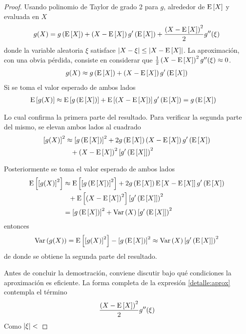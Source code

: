 \begin{proof}
Usando polinomio de Taylor de grado 2 para $g$, alrededor de $\mathrm{E}\left[ X \right]$ y evaluada en $X$
\begin{equation}
g(X) = g\left( \mathrm{E}\left[ X \right] \right) + \left(X - \mathrm{E}\left[ X \right] \right) g^{\prime} \left( \mathrm{E}\left[ X \right] \right) + \frac{\left( X - \mathrm{E}\left[ X \right] \right)^{2}}{2} g^{\prime \prime}(\xi)
\label{detalle:aprox}
\end{equation}
donde la variable aleatoria $\xi$ satisface $\left| X-\xi \right| \leq \left| X - \mathrm{E}\left[ X \right] \right|$.
%
La aproximación, con una obvia pérdida, consiste en considerar que $\frac{1}{2}\left( X - \mathrm{E}\left[ X \right] \right)^{2} g^{\prime \prime}(\xi) \approx 0$.
\begin{equation}
g(X) \approx g\left( \mathrm{E}\left[ X \right] \right) + \left(X - \mathrm{E}\left[ X \right] \right) g^{\prime} \left( \mathrm{E}\left[ X \right] \right)
\end{equation}
Si se toma el valor esperado de ambos lados
\begin{align}
\mathrm{E}\left[ g(X) \right] &\approx \mathrm{E}\left[ g\left( \mathrm{E}\left[ X \right] \right) \right] + \mathrm{E}\left[ \left(X - \mathrm{E}\left[ X \right] \right) \right] g^{\prime} \left( \mathrm{E}\left[ X \right] \right) = g\left( \mathrm{E}\left[ X \right] \right)
\end{align}

Lo cual confirma la primera parte del resultado. Para verificar la segunda parte del mismo, se elevan ambos lados al cuadrado
\begin{align}
\left[g(X)\right]^{2} &\approx \left[g\left( \E{X} \right)\right]^{2} + 2 g\left( \E{X} \right) \left(X - \E{X} \right) g\prima \left( \E{X} \right) \nonumber \\
&\pheq + \left(X - \E{X} \right)^{2} \left[ g\prima \left( \E{X} \right] \right)^{2}
\end{align}

Posteriormente se toma el valor esperado de ambos lados
\begin{align*}
\E{\left[g(X)\right]^{2}} &\approx \E{\left[g\left( \E{X} \right)\right]^{2}} + 2 g\left( \E{X} \right) \E{X - \E{X} } g\prima \left( \E{X} \right) \nonumber \\
&\pheq + \E{\left(X - \E{X} \right)^{2}} \left[ g\prima \left( \E{X} \right] \right)^{2} \\
&= \left[g\left( \E{X} \right)\right]^{2} + \Var{X} \left[ g\prima \left( \E{X} \right] \right)^{2}
\end{align*}
entonces
\begin{equation}
\mathrm{Var}\left( g(X) \right) = \mathrm{E}\left[ \left[g(X)\right]^{2} \right] - \left[g\left( \mathrm{E}\left[ X \right] \right)\right]^{2} \approx \mathrm{Var}\left( X \right) \left[ g^{\prime} \left( \mathrm{E}\left[ X \right] \right] \right)^{2}
\end{equation}
de donde se obtiene la segunda parte del resultado. 

Antes de concluir la demostración, conviene discutir bajo qué condiciones la aproximación es eficiente. La forma completa de la expresión \ref{detalle:aprox} contempla el término
\begin{equation}
\frac{\left( X - \mathrm{E}\left[ X \right] \right)^{2}}{2} g^{\prime \prime}(\xi)
\end{equation}
Como $\left| \xi \right| < $
\end{proof}

